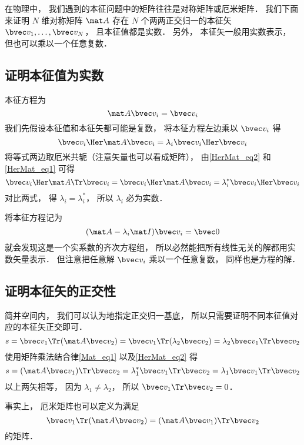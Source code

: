 

在物理中， 我们遇到的本征问题中的矩阵往往是对称矩阵或厄米矩阵． %
我们下面来证明 $N$ 维对称矩阵 $\mat A$ 存在 $N$ 个两两正交归一的本征矢 $\bvec v_1, \dots, \bvec v_N$， 且本征值都是实数． 另外， 本征矢一般用实数表示， 但也可以乘以一个任意复数．


\subsection{证明本征值为实数}
本征方程为
\begin{equation}
\mat A \bvec v_i = \bvec v_i
\end{equation}
我们先假设本征值和本征矢都可能是复数， 将本征方程左边乘以 $\bvec v_i$ 得
\begin{equation}
\bvec v_i\Her \mat A \bvec v_i = \lambda_i \bvec v_i\Her \bvec v_i
\end{equation}
将等式两边取厄米共轭（注意矢量也可以看成矩阵）， 由\autoref{HerMat_eq2} 和\autoref{HerMat_eq1} 可得
\begin{equation}
\bvec v_i\Her \mat A\Tr \bvec v_i = \bvec v_i\Her \mat A \bvec v_i = \lambda_i^* \bvec v_i\Her \bvec v_i
\end{equation}
对比两式， 得 $\lambda_i = \lambda_i^*$， 所以 $\lambda_i$ 必为实数．

将本征方程记为
\begin{equation}
(\mat A - \lambda_i\mat I)\bvec v_i = \bvec 0
\end{equation}
就会发现这是一个实系数的齐次方程组， 所以必然能把所有线性无关的解都用实数矢量表示． 但注意把任意解 $\bvec v_i$ 乘以一个任意复数， 同样也是方程的解．

\subsection{证明本征矢的正交性}
简并空间内， 我们可以认为地指定正交归一基底， 所以只需要证明不同本征值对应的本征矢正交即可．
\begin{equation}
s = \bvec v_1\Tr (\mat A \bvec v_2) = \bvec v_1\Tr (\lambda_2 \bvec v_2) = \lambda_2 \bvec v_1\Tr \bvec v_2
\end{equation}
使用矩阵乘法结合律\autoref{Mat_eq1} 以及\autoref{HerMat_eq2} 得
\begin{equation}
s = (\mat A \bvec v_1)\Tr \bvec v_2 = \lambda_1^* \bvec v_1\Tr \bvec v_2 = \lambda_1 \bvec v_1\Tr \bvec v_2
\end{equation}
以上两矢相等， 因为 $\lambda_1 \ne \lambda_2$， 所以 $\bvec v_1\Tr \bvec v_2 = 0$．

事实上， 厄米矩阵也可以定义为满足
\begin{equation}
\bvec v_1\Tr (\mat A \bvec v_2) = (\mat A \bvec v_1)\Tr \bvec v_2
\end{equation}
的矩阵．
